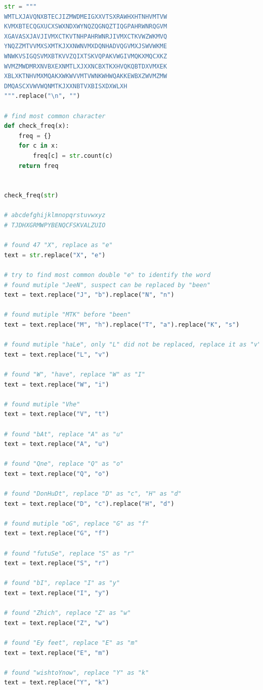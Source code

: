 \documentclass[11pt]{article}
\begin{document}
\begin{lstlisting}[language=Python]
str = """
WMTLXJAVQNXBTECJIZMWDMEIGXXVTSXRAWHXHTNHVMTVW
KVMXBTECQGXUCXSWXNDXWYNQZQGNQZTIQGPAHRWNRQGVM
XGAVASXJAVJIVMXCTKVTNHPAHRWNRJIVMXCTKVWZWKMVQ
YNQZZMTVVMXSXMTKJXXNWNVMXDQNHADVQGVMXJSWVWKME
WNWKVSIGQSVMXBTKVVZQIXTSKVQPAKVWGIVMQKXMQCXKZ
WVMZMWDMRXNVBXEXNMTLXJXXNCBXTKXHVQKQBTDXVMXEK
XBLXKTNHVMXMQAKXWKWVVMTVWNKWHWQAKKEWBXZWVMZMW
DMQASCXVWVWQNMTKJXXNBTVXBISXDXWLXH
""".replace("\n", "")

# find most common character
def check_freq(x):
    freq = {}
    for c in x:
        freq[c] = str.count(c)
    return freq


check_freq(str)

# abcdefghijklmnopqrstuvwxyz
# TJDHXGRMWPYBENQCFSKVALZUIO

# found 47 "X", replace as "e"
text = str.replace("X", "e")

# try to find most common double "e" to identify the word
# found mutiple "JeeN", suspect can be replaced by "been"
text = text.replace("J", "b").replace("N", "n")

# found mutiple "MTK" before "been"
text = text.replace("M", "h").replace("T", "a").replace("K", "s")

# found mutiple "haLe", only "L" did not be replaced, replace it as "v"
text = text.replace("L", "v")

# found "W", "have", replace "W" as "I"
text = text.replace("W", "i")

# found mutiple "Vhe"
text = text.replace("V", "t")

# found "bAt", replace "A" as "u"
text = text.replace("A", "u")

# found "Qne", replace "Q" as "o"
text = text.replace("Q", "o")

# found "DonHuDt", replace "D" as "c", "H" as "d"
text = text.replace("D", "c").replace("H", "d")

# found mutiple "oG", replace "G" as "f"
text = text.replace("G", "f")

# found "futuSe", replace "S" as "r"
text = text.replace("S", "r")

# found "bI", replace "I" as "y"
text = text.replace("I", "y")

# found "Zhich", replace "Z" as "w"
text = text.replace("Z", "w")

# found "Ey feet", replace "E" as "m"
text = text.replace("E", "m")

# found "wishtoYnow", replace "Y" as "k"
text = text.replace("Y", "k")


\end{lstlisting}
\end{document}
